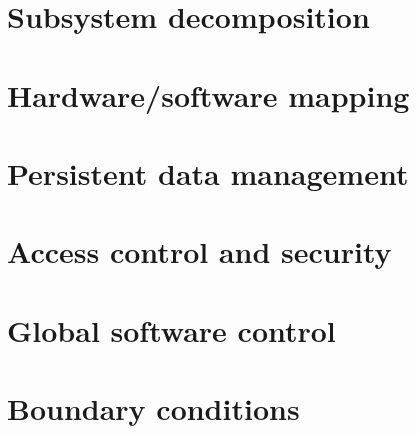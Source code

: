 \documentclass[a4paper,12pt]{article}
\begin{document}
    \section{Subsystem decomposition}



    \section{Hardware/software mapping}

    \section{Persistent data management} %



    \section{Access control and security} %


    \section{Global software control} %



    \section{Boundary conditions} %
\end{document}
